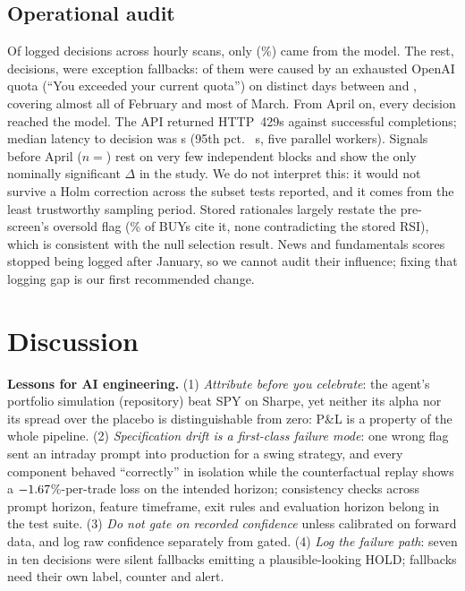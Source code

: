 \documentclass[conference]{IEEEtran}
\newcommand{\pct}[1]{$#1$\%}
\begin{document}
\subsection{Operational audit}
\label{sec:ops}
Of \opDecisions{} logged decisions across \opScans{} hourly scans, only \opReal{} (\opRealPct\%) came from the model. The rest, \opFallback{} decisions, were exception fallbacks: \opQuota{} of them were caused by an exhausted OpenAI quota (``You exceeded your current quota'') on \opQuotaDays{} distinct days between \opQuotaFirst{} and \opQuotaLast{}, covering almost all of February and most of March. From April on, every decision reached the model. The API returned \opHttpLimited{} HTTP~429s against \opHttpOk{} successful completions; median latency to decision was \opLatMed{} s (95th pct.\ \opLatPtf{} s, five parallel workers). Signals before April ($n{=}$\perQuotaN{}) rest on very few independent blocks and show the only nominally significant $\Delta$ in the study. We do not interpret this: it would not survive a Holm correction across the subset tests reported, and it comes from the least trustworthy sampling period. Stored rationales largely restate the pre-screen's oversold flag (\auCiteOversold\% of BUYs cite it, none contradicting the stored RSI), which is consistent with the null selection result. News and fundamentals scores stopped being logged after January, so we cannot audit their influence; fixing that logging gap is our first recommended change.

\section{Discussion}
\textbf{Lessons for AI engineering.} (1) \emph{Attribute before you celebrate}: the agent's portfolio simulation (repository) beat SPY on Sharpe, yet neither its alpha nor its spread over the placebo is distinguishable from zero: P\&L is a property of the whole pipeline. (2) \emph{Specification drift is a first-class failure mode}: one wrong flag sent an intraday prompt into production for a swing strategy, and every component behaved ``correctly'' in isolation while the counterfactual replay shows a \pct{\depGap}-per-trade loss on the intended horizon; consistency checks across prompt horizon, feature timeframe, exit rules and evaluation horizon belong in the test suite. (3) \emph{Do not gate on recorded confidence} unless calibrated on forward data, and log raw confidence separately from gated. (4) \emph{Log the failure path}: seven in ten decisions were silent fallbacks emitting a plausible-looking HOLD; fallbacks need their own label, counter and alert.
\end{document}
